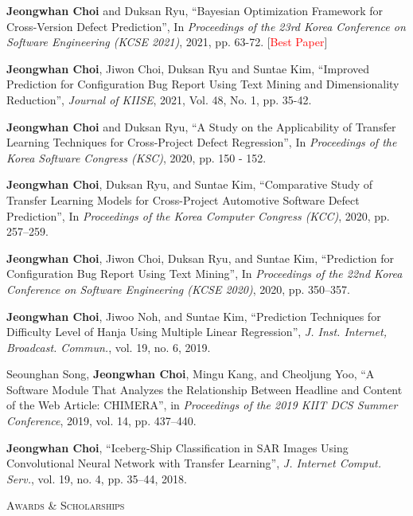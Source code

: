 \documentclass[10pt]{article}
\newenvironment{changemargin}[2]{
  \begin{list}{}{
    \setlength{\topsep}{0pt}
    \setlength{\leftmargin}{#1}
    \setlength{\rightmargin}{#2}
    \setlength{\listparindent}{\parindent}
    \setlength{\itemindent}{\parindent}
    \setlength{\parsep}{\parskip}
  }
  \item[]}{\end{list}
}
\newcommand{\lineover}{
	\begin{changemargin}{-0.05in}{-0.05in}
		\vspace*{-8pt}
		\hrulefill \\
		\vspace*{-2pt}
	\end{changemargin}
}
\newcommand{\header}[1]{
	\begin{changemargin}{-0.5in}{-0.5in}
		\scshape{#1}\\
  	\lineover
	\end{changemargin}
}
\newcommand{\presentation}[2]{
	{#1} \hfill \emph{#2}\\ \bigskip
}
\newcommand{\RED}[1]{\textcolor{red}{#1}}
\newenvironment{body} {
	\vspace*{-16pt}
	\begin{changemargin}{-0.25in}{-0.5in}
  }
	{\end{changemargin}
}
\begin{document}
\begin{body}
\presentation{\textbf{Jeongwhan Choi} and Duksan Ryu, ``Bayesian Optimization Framework for Cross-Version Defect Prediction'', In \emph{Proceedings of the 23rd Korea Conference on Software Engineering (KCSE 2021)}, 2021, pp. 63-72.  [\RED{Best Paper}]}{}
\presentation{\textbf{Jeongwhan Choi}, Jiwon Choi, Duksan Ryu and Suntae Kim, ``Improved Prediction for Configuration Bug Report Using Text Mining and Dimensionality Reduction'', \emph{Journal of KIISE}, 2021, Vol. 48, No. 1, pp. 35-42.}{}
\presentation{\textbf{Jeongwhan Choi} and Duksan Ryu, ``A Study on the Applicability of Transfer Learning Techniques for Cross-Project Defect Regression'', In \emph{Proceedings of the Korea Software Congress (KSC)}, 2020, pp. 150 - 152.}{}
\presentation{\textbf{Jeongwhan Choi}, Duksan Ryu, and Suntae Kim, ``Comparative Study of Transfer Learning Models for Cross-Project Automotive Software Defect Prediction'', In \emph{Proceedings of the Korea Computer Congress (KCC)}, 2020, pp. 257–259.}{}
\presentation{\textbf{Jeongwhan Choi}, Jiwon Choi, Duksan Ryu, and Suntae Kim, ``Prediction for Configuration Bug Report Using Text Mining'', In \emph{Proceedings of the 22nd Korea Conference on Software Engineering (KCSE 2020)}, 2020, pp. 350–357.}{}
\presentation{\textbf{Jeongwhan Choi}, Jiwoo Noh, and Suntae Kim, ``Prediction Techniques for Difficulty Level of Hanja Using Multiple Linear Regression'', \emph{J. Inst. Internet, Broadcast. Commun.}, vol. 19, no. 6, 2019.}{}
\presentation{Seounghan Song, \textbf{Jeongwhan Choi}, Mingu Kang, and Cheoljung Yoo, ``A Software Module That Analyzes the Relationship Between Headline and Content of the Web Article: CHIMERA'', in \emph{Proceedings of the 2019 KIIT DCS Summer Conference}, 2019, vol. 14, pp. 437–440.}{}
\presentation{\textbf{Jeongwhan Choi}, ``Iceberg-Ship Classification in SAR Images Using Convolutional Neural Network with Transfer Learning'', \emph{J. Internet Comput. Serv.}, vol. 19, no. 4, pp. 35–44, 2018.}{}

\end{body}

\medskip

\header{Awards \& Scholarships}
\end{document}

